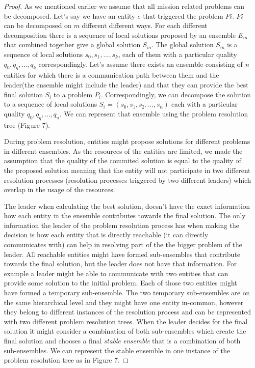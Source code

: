 \documentclass[journal]{IEEEtran}
\theoremstyle{definition}
\begin{document}
\begin{proof}
As we mentioned earlier we assume that all mission related problems can be decomposed. Let's say we have an entity $e$ that triggered the problem $Pi$. $Pi$ can be decomposed on $m$ different different ways. For each different decomposition there is a sequence of local solutions proposed by an ensemble $E_m$  that combined together give a global solution $S_m$. The global solution $S_m$ is a sequence of local solutions $s_0, s_1, ..., s_k$, each of them with a particular quality $q_0, q_q, ..., q_k$ correspondingly. Let's assume there exists an ensemble consisting of \textit{n} entities for which there is a communication path between them and the leader(the ensemble might include the leader) and that they can provide the best final solution $S_i$ to a problem $P_i$. Correspondingly, we can decompose the solution to a sequence of local solutions $S_i=(s_0, s_1, s_2, ..., s_n)$ each with a particular quality  $q_0, q_q, ..., q_n$.  We can represent that ensemble using the problem resolution tree (Figure 7). 

During problem resolution, entities might propose solutions for different problems in different ensembles. As the resources of the entities are limited, we made the assumption that the quality of the commited solution is equal to the quality of the proposed solution meaning that the entity will not participate in two different resolution processes (resolution processes triggered by two different leaders) which overlap in the usage of the resources.

The leader when calculating the best solution, doesn't have the exact information how each entity in the ensemble contributes towards the final solution. The only information the leader of the problem resolution process has when making the decision is how each entity that is directly reachable (it can directly communicates with) can help in resolving part of the the bigger problem of the leader. All reachable entities might have formed sub-ensembles that contribute towards the final solution, but the leader does not have that information.
For example a leader might be able to communicate with two entities that can provide some solution to the initial problem. Each of those two entities might have formed a temporary sub-ensemble. 
The two temporary sub-ensembles are on the same hierarchical level and they might have one entity in-common, however they belong to different instances of the resolution process and can be represented with two different problem resolution trees. When the leader decides for the final solution it might consider a combination of both sub-ensembles which create the final solution and chooses a final \textit{stable ensemble} that is a combination of both sub-ensembles. We can represent the stable ensemble in one instance of the problem resolution tree as in Figure 7.


\end{proof}
\end{document}
